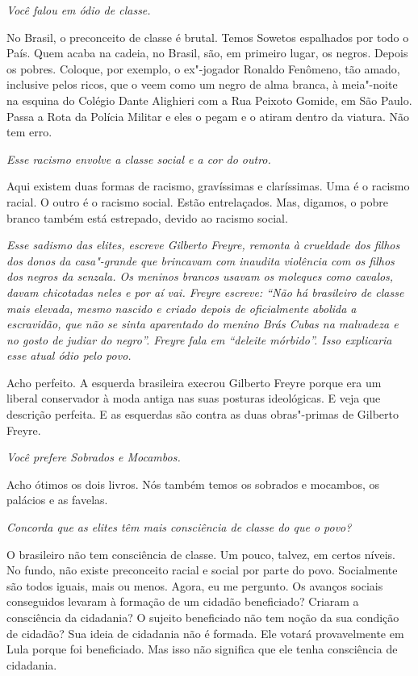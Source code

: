\itshape
 Você falou em ódio de classe.

\normalfont 
No Brasil, o preconceito de classe é brutal. Temos
Sowetos espalhados por todo o País. Quem acaba na cadeia, no Brasil,
são, em primeiro lugar, os negros. Depois os pobres. Coloque, por
exemplo, o ex"-jogador Ronaldo Fenômeno, tão amado, inclusive pelos
ricos, que o veem como um negro de alma branca, à meia"-noite na esquina
do Colégio Dante Alighieri com a Rua Peixoto Gomide, em São Paulo. Passa
a Rota da Polícia Militar e eles o pegam e o atiram dentro da viatura.
Não tem erro.

\itshape
 Esse racismo envolve a classe social e a cor do outro.

\normalfont 
Aqui existem duas formas de racismo, gravíssimas e
claríssimas. Uma é o racismo racial. O outro é o racismo social. Estão
entrelaçados. Mas, digamos, o pobre branco também está estrepado, devido
ao racismo social.

\itshape
 Esse sadismo das elites, escreve Gilberto Freyre,
remonta à crueldade dos filhos dos donos da casa"-grande que brincavam
com inaudita violência com os filhos dos negros da senzala. Os meninos
brancos usavam os moleques como cavalos, davam chicotadas neles e por aí
vai. Freyre escreve: ``Não há brasileiro de classe mais elevada, mesmo
nascido e criado depois de oficialmente abolida a escravidão, que não se
sinta aparentado do menino Brás Cubas na malvadeza e no gosto de judiar
do negro''. Freyre fala em ``deleite mórbido''. Isso explicaria esse
atual ódio pelo povo.

\normalfont 
Acho perfeito. A esquerda brasileira execrou Gilberto
Freyre porque era um liberal conservador à moda antiga nas suas posturas
ideológicas. E veja que descrição perfeita. E as esquerdas são contra as
duas obras"-primas de Gilberto Freyre.

\itshape
 Você prefere \emph{Sobrados e Mocambos}.

\normalfont 
Acho ótimos os dois livros. Nós também temos os sobrados
e mocambos, os palácios e as favelas.

\itshape
 Concorda que as elites têm mais consciência de classe
do que o povo?

\normalfont 
O brasileiro não tem consciência de classe. Um pouco,
talvez, em certos níveis. No fundo, não existe preconceito racial e
social por parte do povo. Socialmente são todos iguais, mais ou menos.
Agora, eu me pergunto. Os avanços sociais conseguidos levaram à formação
de um cidadão beneficiado? Criaram a consciência da cidadania? O sujeito
beneficiado não tem noção da sua condição de cidadão? Sua ideia de
cidadania não é formada. Ele votará provavelmente em Lula porque foi
beneficiado. Mas isso não significa que ele tenha consciência de
cidadania.

